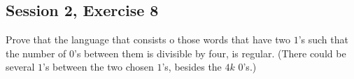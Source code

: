 \subsection{Session 2, Exercise 8}


Prove that the language that consists o those words that have two $1$'s such that the number of $0$'s between them is divisible by four, is regular. (There could be several $1$'s between the two chosen $1$'s, besides the $4k$ $0$'s.)

